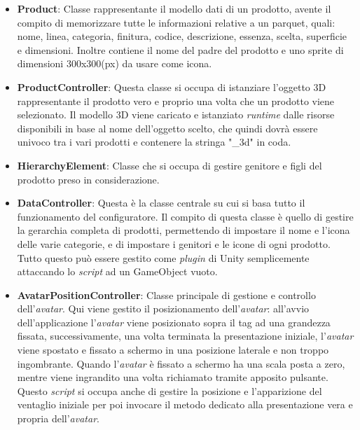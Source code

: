 \begin{itemize}
	\item \textbf{Product}: Classe rappresentante il modello dati di un prodotto, avente il compito di memorizzare tutte le informazioni relative a un parquet, quali: nome, linea, categoria, finitura, codice, descrizione, essenza, scelta, superficie e dimensioni. Inoltre contiene il nome del padre del prodotto e uno sprite di dimensioni 300x300(px) da usare come icona.
	
	\item \textbf{ProductController}: Questa classe si occupa di istanziare l'oggetto 3D rappresentante il prodotto vero e proprio una volta che un prodotto viene selezionato. Il modello 3D viene caricato e istanziato \textit{runtime} dalle risorse disponibili in base al nome dell'oggetto scelto, che quindi dovr\`a essere univoco tra i vari prodotti e contenere la stringa "\_3d" in coda.
	
	\item \textbf{HierarchyElement}: Classe che si occupa di gestire genitore e figli del prodotto preso in considerazione.
	
	\item \textbf{DataController}: Questa \`e la classe centrale su cui si basa tutto il funzionamento del configuratore. Il compito di questa classe \`e quello di gestire la gerarchia completa di prodotti, permettendo di impostare il nome e l'icona delle varie categorie, e di impostare i genitori e le icone di ogni prodotto. Tutto questo pu\`o essere gestito come \textit{plugin} di Unity semplicemente attaccando lo \textit{script} ad un GameObject vuoto.
	
	\item \textbf{AvatarPositionController}: Classe principale di gestione e controllo dell'\textit{avatar\gloss}. Qui viene gestito il posizionamento dell'\textit{avatar\gloss}: all'avvio dell'applicazione l'\textit{avatar\gloss} viene posizionato sopra il tag ad una grandezza fissata, successivamente, una volta terminata la presentazione iniziale, l'\textit{avatar\gloss} viene spostato e fissato a schermo in una posizione laterale e non troppo ingombrante. Quando l'\textit{avatar\gloss} \`e fissato a schermo ha una scala posta a zero, mentre viene ingrandito una volta richiamato tramite apposito pulsante. Questo \textit{script} si occupa anche di gestire la posizione e l'apparizione del ventaglio iniziale per poi invocare il metodo dedicato alla presentazione vera e propria dell'\textit{avatar\gloss}.
	

\end{itemize}
